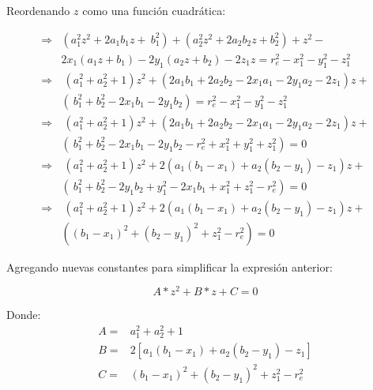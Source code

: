         Reordenando $z$ como una función cuadrática:

        \begin{align*}
               \Longrightarrow&\left( a_{1}^{2}z^{2}+2a_{1}b_{1}z+~b_{1}^{2} \right) + \left( a_{2}^{2}z^{2}+2a_{2}b_{2}z+b_{2}^{2} \right)  +z^{2}-\\&2x_{1} \left( a_{1}z+ b_{1} \right) -2y_{1} \left( a_{2}z+ b_{2} \right) -2z_{1}z = r_{e}^{2}- x_{1}^{2}- y_{1}^{2}-z_{1}^{2}\\
              \Longrightarrow& ~  \left( a_{1}^{2}+a_{2}^{2}+1 \right) z^{2}+ \left( 2a_{1}b_{1}+2a_{2}b_{2}-2x_{1}a_{1}-2y_{1}a_{2}-2z_{1} \right) z+\\& \left( ~b_{1}^{2}+b_{2}^{2}-2x_{1}b_{1}-2y_{1}b_{2} \right) = r_{e}^{2}- x_{1}^{2}- y_{1}^{2}-z_{1}^{2} \\
               \Longrightarrow& ~  \left( a_{1}^{2}+a_{2}^{2}+1 \right) z^{2}+ \left( 2a_{1}b_{1}+2a_{2}b_{2}-2x_{1}a_{1}-2y_{1}a_{2}-2z_{1} \right) z+\\& \left( ~b_{1}^{2}+b_{2}^{2}-2x_{1}b_{1}-2y_{1}b_{2}- r_{e}^{2}+ x_{1}^{2}+ y_{1}^{2}+z_{1}^{2} \right) =0 \\         
             \Longrightarrow& ~  \left( a_{1}^{2}+a_{2}^{2}+1 \right) z^{2}+2 \left( a_{1} \left( b_{1}-x_{1} \right) +a_{2} \left( b_{2}-y_{1} \right) -z_{1} \right) z+\\& \left( ~b_{1}^{2}+b_{2}^{2}-2y_{1}b_{2}+ y_{1}^{2}-2x_{1}b_{1}+ x_{1}^{2}+z_{1}^{2}- r_{e}^{2} \right) =0\\
            \Longrightarrow &~  \left( a_{1}^{2}+a_{2}^{2}+1 \right) z^{2}+2 \left( a_{1} \left( b_{1}-x_{1} \right) +a_{2} \left( b_{2}-y_{1} \right) -z_{1} \right) z+\\& \left(  \left( b_{1}-x_{1} \right) ^{2}+ \left( b_{2}-y_{1} \right) ^{2}+z_{1}^{2}- r_{e}^{2} \right) =0
        \end{align*}

        Agregando nuevas constantes para simplificar la expresión anterior:

        \begin{equation*}
         A\ast z^{2}+B\ast z+C=0 
        \end{equation*}

        Donde:
        \begin{align*}
         A=& a_{1}^{2}+a_{2}^{2}+1 \\
         B=& 2 \left[ a_{1} \left( b_{1}-x_{1} \right) +a_{2} \left( b_{2}-y_{1} \right) -z_{1} \right]  \\
        C=&  \left( b_{1}-x_{1} \right) ^{2}+ \left( b_{2}-y_{1} \right) ^{2}+z_{1}^{2}- r_{e}^{2} 
        \end{align*}
        
